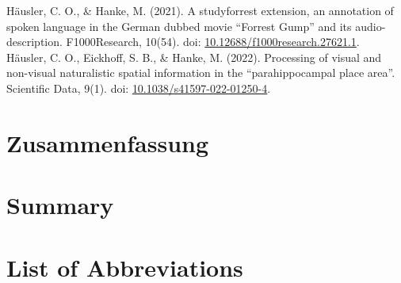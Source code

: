 \documentclass[english,12pt]{report}
\begin{document}
\begin{spacing}{1.5}
\noindent
%
Häusler, C. O.,
%
\& Hanke, M.
%
(2021).
%
A studyforrest extension, an annotation of spoken language in the German dubbed
movie ``Forrest Gump'' and its audio-description.
%
F1000Research, 10(54).
%
doi: \href{https://doi.org/10.12688/f1000research.27621.1}
{10.12688/f1000research.27621.1}.\\

\noindent
%
Häusler, C. O.,
%
Eickhoff, S. B.,
%
\& Hanke, M.
%
(2022).
%
Processing of visual and non-visual naturalistic spatial information in the
``parahippocampal place area''.
%
Scientific Data, 9(1).
%
doi: \href{https://doi.org/10.1038/s41597-022-01250-4}
{10.1038/s41597-022-01250-4}.




\chapter*{Zusammenfassung}
\setcounter{page}{1}








\chapter*{Summary}





\chapter*{List of Abbreviations}




\end{spacing}
\end{document}
